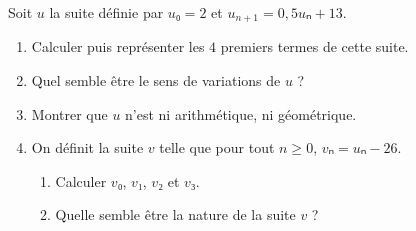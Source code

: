 \documentclass[
	classe=$1^{ere}STI2D$
]{évaluation}
\begin{document}
\begin{exercice}[7]
	Soit $u$ la suite définie par $u₀ = 2$ et $u_{n+1} = 0,5uₙ + 13$.

	\begin{enumerate}
		\item Calculer puis représenter les $4$ premiers termes de cette suite.

		\item Quel semble être le sens de variations de $u$ ?

		\item Montrer que $u$ n'est ni arithmétique, ni géométrique.
		\item On définit la suite $v$ telle que pour tout $n ≥ 0$, $vₙ = uₙ - 26$.
		      \begin{enumerate}
			      \item Calculer $v₀$, $v₁$, $v₂$ et $v₃$.

			      \item Quelle semble être la nature de la suite $v$ ?


\end{enumerate}
\end{enumerate}
\end{exercice}
\end{document}
